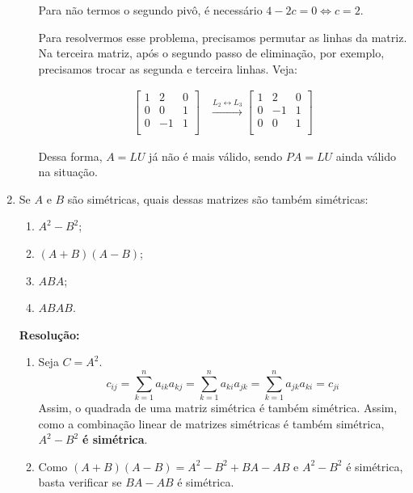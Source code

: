 \documentclass[leqno]{article}
\begin{document}
\begin{enumerate}
\begin{enumerate}
        Para não termos o segundo pivô, é necessário $4-2c=0\iff c=2$.
        
        Para resolvermos esse problema, precisamos permutar as linhas da matriz. Na terceira matriz, após o segundo passo de eliminação, por exemplo, precisamos trocar as segunda e terceira linhas. Veja:
        
        \begin{align*}
            \begin{bmatrix}
            1 & 2 & 0\\
            0 & 0 & 1\\
            0 & -1 & 1\\
            \end{bmatrix}&\xrightarrow{L_2\leftrightarrow L_3}\begin{bmatrix}
            1 & 2 & 0\\
            0 & -1 & 1\\
            0 & 0 & 1\\
            \end{bmatrix}
        \end{align*}
        
        Dessa forma, $A=LU$ já não é mais válido, sendo $PA=LU$ ainda válido na situação.
        
    \end{enumerate}

    \item Se $A$ e $B$ são simétricas, quais dessas matrizes são também simétricas:
        
    \begin{enumerate}
        \item $A^2-B^2$;
        \item $(A+B)(A-B)$;
        \item $ABA$;
        \item $ABAB$.
    \end{enumerate}
    
    \textbf{Resolução:}
    
    \begin{enumerate}
        \item Seja $C=A^2$.
        $$c_{ij}=\sum_{k=1}^n a_{ik}a_{kj}=\sum_{k=1}^n a_{ki}a_{jk}=\sum_{k=1}^n a_{jk}a_{ki}=c_{ji}$$
        Assim, o quadrada de uma matriz simétrica é também simétrica. Assim, como a combinação linear de matrizes simétricas é também simétrica, $A^2-B^2$ \textbf{é simétrica}.
        
        \item Como $(A+B)(A-B)=A^2-B^2+BA-AB$ e $A^2-B^2$ é simétrica, basta verificar se $BA-AB$ é simétrica.
        

\end{enumerate}
\end{enumerate}
\end{document}

